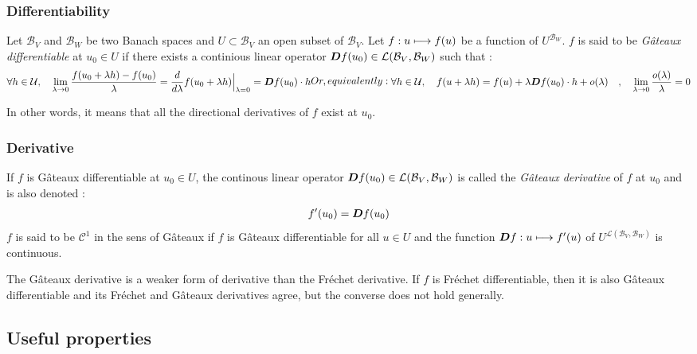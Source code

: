 \subsubsection{Differentiability}
Let $\mathcal{B}_V$ and $\mathcal{B}_W$ be two Banach spaces and $U \subset \mathcal{B}_V$ an open subset of $\mathcal{B}_V$.
Let $f : u \longmapsto f(u)$ be a function of  $U^{\mathcal{B}_W}$.
$f$ is said to be \emph{Gâteaux differentiable} at $u_0\in U$ if there exists a continious linear operator $\boldsymbol{D}f(u_0) \in
\mathcal{L}(\mathcal{B}_V,{\mathcal{B}_W})$ such that :
\begin{subequations}
\begin{align}
\forall h \in \mathcal{U}, \quad\lim_{\lambda \to 0} \frac{f(u_0+\lambda h) - f(u_0)}{\lambda} = \frac{d}{d\lambda}f(u_0+\lambda h)\Bigr|_{\lambda = 0} = \diffof{f}{u_0}{h}
\end{align}
Or, equivalently :
\begin{align}
	\forall h \in \mathcal{U}, \quad f(u+\lambda h) = f(u) + \lambda \diffof{f}{u_0}{h} + o(\lambda)
	\quad , \quad \lim_{\lambda \to 0} \frac{o(\lambda)}{\lambda} = 0
\end{align}
\end{subequations}

In other words, it means that all the directional derivatives of $f$ exist at $u_0$.

\subsubsection{Derivative}
If $f$ is Gâteaux differentiable at $u_0 \in U$, the continous linear operator $\boldsymbol{D}f(u_0) \in
\mathcal{L}(\mathcal{B}_V,{\mathcal{B}_W})$ is called the \emph{Gâteaux derivative} of $f$ at $u_0$ and is also denoted :
\begin{align}
	f'(u_0) = \boldsymbol{D}f(u_0)
\end{align}
$f$ is said to be $\mathcal{C}^1$ in the sens of Gâteaux if $f$ is Gâteaux differentiable for all $u \in U$ and the function $\boldsymbol{D}f : u \longmapsto f'(u)$ of $U^{\mathcal{L}(\mathcal{B}_V,{\mathcal{B}_W})}$ is continuous.

The Gâteaux derivative is a weaker form of derivative than the Fréchet derivative. If $f$ is Fréchet differentiable, then it is also Gâteaux differentiable and its Fréchet and Gâteaux derivatives agree, but the converse does not hold generally.

\subsection{Useful properties}

